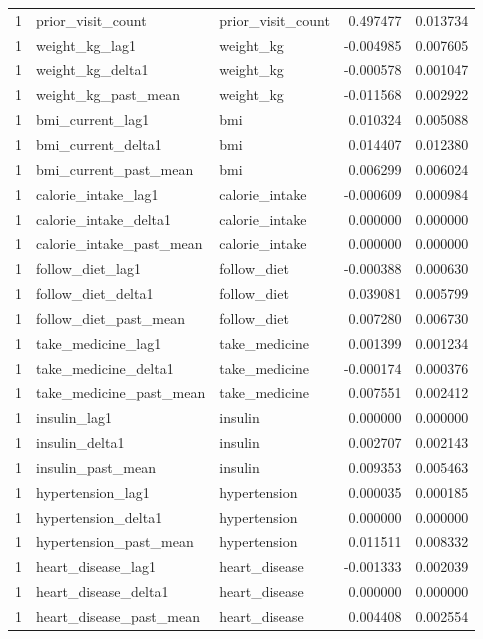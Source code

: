 \begin{longtable}{rllrr}
1 & prior\_visit\_count & prior\_visit\_count & 0.497477 & 0.013734 \\
1 & weight\_kg\_lag1 & weight\_kg & -0.004985 & 0.007605 \\
1 & weight\_kg\_delta1 & weight\_kg & -0.000578 & 0.001047 \\
1 & weight\_kg\_past\_mean & weight\_kg & -0.011568 & 0.002922 \\
1 & bmi\_current\_lag1 & bmi & 0.010324 & 0.005088 \\
1 & bmi\_current\_delta1 & bmi & 0.014407 & 0.012380 \\
1 & bmi\_current\_past\_mean & bmi & 0.006299 & 0.006024 \\
1 & calorie\_intake\_lag1 & calorie\_intake & -0.000609 & 0.000984 \\
1 & calorie\_intake\_delta1 & calorie\_intake & 0.000000 & 0.000000 \\
1 & calorie\_intake\_past\_mean & calorie\_intake & 0.000000 & 0.000000 \\
1 & follow\_diet\_lag1 & follow\_diet & -0.000388 & 0.000630 \\
1 & follow\_diet\_delta1 & follow\_diet & 0.039081 & 0.005799 \\
1 & follow\_diet\_past\_mean & follow\_diet & 0.007280 & 0.006730 \\
1 & take\_medicine\_lag1 & take\_medicine & 0.001399 & 0.001234 \\
1 & take\_medicine\_delta1 & take\_medicine & -0.000174 & 0.000376 \\
1 & take\_medicine\_past\_mean & take\_medicine & 0.007551 & 0.002412 \\
1 & insulin\_lag1 & insulin & 0.000000 & 0.000000 \\
1 & insulin\_delta1 & insulin & 0.002707 & 0.002143 \\
1 & insulin\_past\_mean & insulin & 0.009353 & 0.005463 \\
1 & hypertension\_lag1 & hypertension & 0.000035 & 0.000185 \\
1 & hypertension\_delta1 & hypertension & 0.000000 & 0.000000 \\
1 & hypertension\_past\_mean & hypertension & 0.011511 & 0.008332 \\
1 & heart\_disease\_lag1 & heart\_disease & -0.001333 & 0.002039 \\
1 & heart\_disease\_delta1 & heart\_disease & 0.000000 & 0.000000 \\
1 & heart\_disease\_past\_mean & heart\_disease & 0.004408 & 0.002554 \\

\end{longtable}
